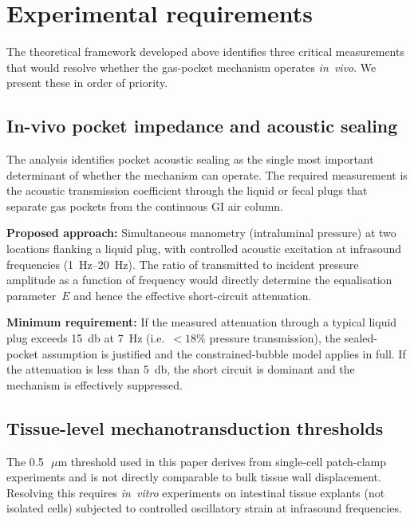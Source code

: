 \documentclass[12pt]{article}
\newcommand{\um}{\ensuremath{\,\mu\text{m}}}
\begin{document}
\section{Experimental requirements}
\label{sec:experiments}

The theoretical framework developed above identifies three critical
measurements that would resolve whether the gas-pocket mechanism operates
\emph{in~vivo}.  We present these in order of priority.

\subsection{In-vivo pocket impedance and acoustic sealing}
\label{sec:exp_impedance}

The analysis identifies pocket acoustic sealing as the single most
important determinant of whether the mechanism can operate.  The required
measurement is the acoustic transmission coefficient through the liquid
or fecal plugs that separate gas pockets from the continuous GI air
column.

\textbf{Proposed approach:} Simultaneous manometry (intraluminal pressure)
at two locations flanking a liquid plug, with controlled acoustic
excitation at infrasound frequencies (\SIrange{1}{20}{\hertz}).  The
ratio of transmitted to incident pressure amplitude as a function of
frequency would directly determine the equalisation parameter~$E$ and
hence the effective short-circuit attenuation.

\textbf{Minimum requirement:} If the measured attenuation through a
typical liquid plug exceeds \SI{15}{\decibel} at \SI{7}{\hertz}
(i.e.\ $<18\%$ pressure transmission), the sealed-pocket assumption
is justified and the constrained-bubble model applies in full.  If
the attenuation is less than \SI{5}{\decibel}, the short circuit is
dominant and the mechanism is effectively suppressed.

\subsection{Tissue-level mechanotransduction thresholds}
\label{sec:exp_threshold}

The \SI{0.5}{\um} threshold used in this paper derives from single-cell
patch-clamp experiments and is not directly comparable to bulk tissue
wall displacement.  Resolving this requires \emph{in~vitro} experiments
on intestinal tissue explants (not isolated cells) subjected to
controlled oscillatory strain at infrasound frequencies.
\end{document}
